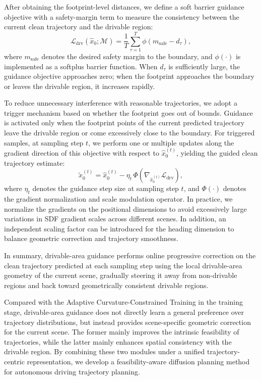 \documentclass[3p,times,authoryear]{elsarticle}
\begin{document}
After obtaining the footprint-level distances, we define a soft barrier guidance objective with a safety-margin term to measure the consistency between the current clean trajectory and the drivable region:
\begin{equation}
\mathcal{L}_{\mathrm{drv}}\!\left(\hat{x}_0; \mathcal{M}\right)
= \frac{1}{T} \sum_{\tau=1}^{T} \phi\!\left(m_{\mathrm{safe}} - d_{\tau}\right),
\end{equation}
where $m_{\mathrm{safe}}$ denotes the desired safety margin to the boundary, and $\phi(\cdot)$ is implemented as a softplus barrier function. When $d_{\tau}$ is sufficiently large, the guidance objective approaches zero; when the footprint approaches the boundary or leaves the drivable region, it increases rapidly.

To reduce unnecessary interference with reasonable trajectories, we adopt a trigger mechanism based on whether the footprint goes out of bounds. Guidance is activated only when the footprint points of the current predicted trajectory leave the drivable region or come excessively close to the boundary. For triggered samples, at sampling step $t$, we perform one or multiple updates along the gradient direction of this objective with respect to $\hat{x}_0^{(t)}$, yielding the guided clean trajectory estimate:
\begin{equation}
\tilde{x}_0^{(t)} = \hat{x}_0^{(t)} - \eta_t \, \Phi\!\left( \nabla_{\hat{x}_0^{(t)}} \mathcal{L}_{\mathrm{drv}} \right),
\end{equation}
where $\eta_t$ denotes the guidance step size at sampling step $t$, and $\Phi(\cdot)$ denotes the gradient normalization and scale modulation operator. In practice, we normalize the gradients on the positional dimensions to avoid excessively large variations in SDF gradient scales across different scenes. In addition, an independent scaling factor can be introduced for the heading dimension to balance geometric correction and trajectory smoothness.

In summary, drivable-area guidance performs online progressive correction on the clean trajectory predicted at each sampling step using the local drivable-area geometry of the current scene, gradually steering it away from non-drivable regions and back toward geometrically consistent drivable regions.

Compared with the Adaptive Curvature-Constrained Training in the training stage, drivable-area guidance does not directly learn a general preference over trajectory distributions, but instead provides scene-specific geometric correction for the current scene. The former mainly improves the intrinsic feasibility of trajectories, while the latter mainly enhances spatial consistency with the drivable region. By combining these two modules under a unified trajectory-centric representation, we develop a feasibility-aware diffusion planning method for autonomous driving trajectory planning.
\end{document}
